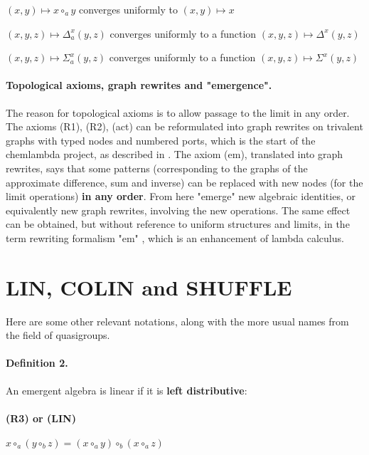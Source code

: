 \documentclass{article}
\begin{document}
     $\displaystyle (x,y) \mapsto x \circ_a y$ converges uniformly to  $(x,y) \mapsto x$  

     $\displaystyle (x,y,z) \mapsto \Delta^{x}_{a} (y , z)$ converges uniformly to a function $(x,y,z) \mapsto \Delta^{x} (y , z)$

      $(\displaystyle x,y,z) \mapsto \Sigma^{x}_{a} (y , z)$ converges uniformly to a function $(x,y,z) \mapsto \Sigma^{x} (y , z)$ \\

\paragraph{Topological axioms, graph rewrites and "emergence".} The reason for topological axioms is to allow passage to the limit in any order. The axioms (R1), (R2), (act) can be reformulated into graph rewrites on trivalent graphs with typed nodes and numbered ports, which is the start of the chemlambda project, as described in \cite{buligahis}.  The axiom (em), translated into graph rewrites, says that some patterns (corresponding to the graphs of the approximate difference, sum and inverse) can be replaced with new nodes (for the limit operations) {\bf in any order}. From here "emerge" new algebraic identities, or equivalently new graph rewrites, involving the new operations. The same effect can be obtained, but without reference to uniform structures and limits, in the term rewriting formalism "em" \cite{buligaem}, which is an enhancement of lambda calculus. \\


\section{LIN, COLIN and SHUFFLE}

Here are some other relevant notations, along with the more usual names from the field of quasigroups.


\paragraph{Definition 2.} An emergent algebra is linear if it is {\bf left distributive}:\\ 

\paragraph{ (R3) or (LIN)} $\displaystyle x \circ_{a} (y \circ_{b} z) = (x \circ_{a} y) \circ_{b} (x \circ_{a} z)$ \\
\end{document}
